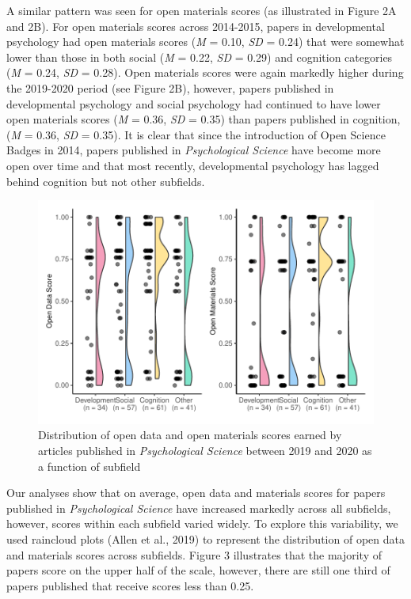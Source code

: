 \documentclass[
  english,
  man,floatsintext]{apa6}
\begin{document}
A similar pattern was seen for open materials scores (as illustrated in Figure 2A and 2B). For open materials scores across 2014-2015, papers in developmental psychology had open materials scores (\emph{M} = 0.10, \emph{SD} = 0.24) that were somewhat lower than those in both social (\emph{M} = 0.22, \emph{SD} = 0.29) and cognition categories (\emph{M} = 0.24, \emph{SD} = 0.28). Open materials scores were again markedly higher during the 2019-2020 period (see Figure 2B), however, papers published in developmental psychology and social psychology had continued to have lower open materials scores (\emph{M} = 0.36, \emph{SD} = 0.35) than papers published in cognition, (\emph{M} = 0.36, \emph{SD} = 0.35). It is clear that since the introduction of Open Science Badges in 2014, papers published in \emph{Psychological Science} have become more open over time and that most recently, developmental psychology has lagged behind cognition but not other subfields.

\begin{figure}
\centering
\includegraphics{icd_special_issue_revision_files/figure-latex/rain-1.pdf}
\caption{\label{fig:rain}Distribution of open data and open materials scores earned by articles published in \emph{Psychological Science} between 2019 and 2020 as a function of subfield}
\end{figure}

Our analyses show that on average, open data and materials scores for papers published in \emph{Psychological Science} have increased markedly across all subfields, however, scores within each subfield varied widely. To explore this variability, we used raincloud plots (Allen et al., 2019) to represent the distribution of open data and materials scores across subfields. Figure 3 illustrates that the majority of papers score on the upper half of the scale, however, there are still one third of papers published that receive scores less than 0.25.
\end{document}
